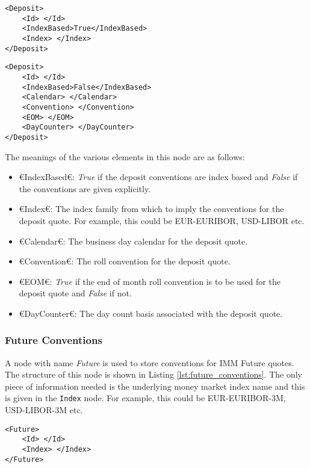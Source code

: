 {\footnotesize
\begin{lstlisting}[caption={Deposit conventions, index based}, label=lst:deposit_conventions_index]
<Deposit>
	<Id> </Id>
	<IndexBased>True</IndexBased>
	<Index> </Index>
</Deposit>
\end{lstlisting}
}

{\footnotesize
\begin{lstlisting}[caption={Deposit conventions, explicit}, label=lst:deposit_conventions_explicit]
<Deposit>
	<Id> </Id>
	<IndexBased>False</IndexBased>
	<Calendar> </Calendar>
	<Convention> </Convention>
	<EOM> </EOM>
	<DayCounter> </DayCounter>
</Deposit>
\end{lstlisting}
}

The meanings of the various elements in this node are as follows:
\begin{itemize}
\item €IndexBased€: \emph{True} if the deposit conventions are index based and \emph{False} if the conventions are given 
explicitly.
\item €Index€: The index family from which to imply the conventions for the deposit quote. For example, this could be 
EUR-EURIBOR, USD-LIBOR etc.
\item €Calendar€: The business day calendar for the deposit quote.
\item €Convention€: The roll convention for the deposit quote.
\item €EOM€: \emph{True} if the end of month roll convention is to be used for the deposit quote and \emph{False} if not.
\item €DayCounter€: The day count basis associated with the deposit quote.
\end{itemize}

\subsubsection{Future Conventions}
A node with name \emph{Future} is used to store conventions for IMM Future quotes. The structure of this node is shown in 
Listing \ref{lst:future_conventions}. The only piece of information needed is the underlying money market index name and 
this is given in the \lstinline!Index! node. For example, this could be EUR-EURIBOR-3M, USD-LIBOR-3M etc.

{\footnotesize
\begin{lstlisting}[caption={Future conventions}, label=lst:future_conventions]
<Future>
	<Id> </Id>
	<Index> </Index>
</Future>
\end{lstlisting}
}

